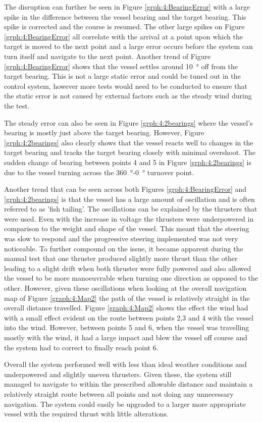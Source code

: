 The disruption can further be seen in Figure \ref{grph:4:BearingError} with a large spike in the difference between the vessel bearing and the target bearing. This spike is corrected and the course is resumed. The other large spikes on Figure \ref{grph:4:BearingError} all correlate with the arrival at a point upon which the target is moved to the next point and a large error occurs before the system can turn itself and navigate to the next point. Another trend of Figure \ref{grph:4:BearingError} shows that the vessel settles around \SI{10}{\degree} off from the target bearing. This is not a large static error and could be tuned out in the control system, however more tests would need to be conducted to ensure that the static error is not caused by external factors such as the steady wind during the test. \par
The steady error can also be seen in Figure \ref{grph:4:2bearings} where the vessel's bearing is mostly just above the target bearing. However, Figure \ref{grph:4:2bearings} also clearly shows that the vessel reacts well to changes in the target bearing and tracks the target bearing closely with minimal overshoot. The sudden change of bearing between points 4 and 5 in Figure \ref{grph:4:2bearings} is due to the vessel turning across the \SI{360}{\degree}-\SI{0}{\degree} turnover point. \par
Another trend that can be seen across both Figures \ref{grph:4:BearingError} and \ref{grph:4:2bearings} is that the vessel has a large amount of oscillation and is often referred to as 'fish tailing'. The oscillations can be explained by the thrusters that were used. Even with the increase in voltage the thrusters were underpowered in comparison to the weight and shape of the vessel. This meant that the steering was slow to respond and the progressive steering implemented was not very noticeable. To further compound on the issue, it became apparent during the manual test that one thruster produced slightly more thrust than the other leading to a slight drift when both thruster were fully powered and also allowed the vessel to be more manoeuvrable when turning one direction as opposed to the other. However, given these oscillations when looking at the overall navigation map of Figure \ref{graph:4:Map2} the path of the vessel is relatively straight in the overall distance travelled. Figure \ref{graph:4:Map2} shows the effect the wind had with a small effect evident on the route between points 2,3 and 4 with the vessel into the wind. However, between points 5 and 6, when the vessel was travelling mostly with the wind, it had a large impact and blew the vessel off course and the system had to correct to finally reach point 6.\par
Overall the system performed well with less than ideal weather conditions and underpowered and slightly uneven thrusters. Given these, the system still managed to navigate to within the prescribed allowable distance and maintain a relatively straight route between all points and not doing any unnecessary navigation. The system could easily be upgraded to a larger more appropriate vessel with the required thrust with little alterations.

